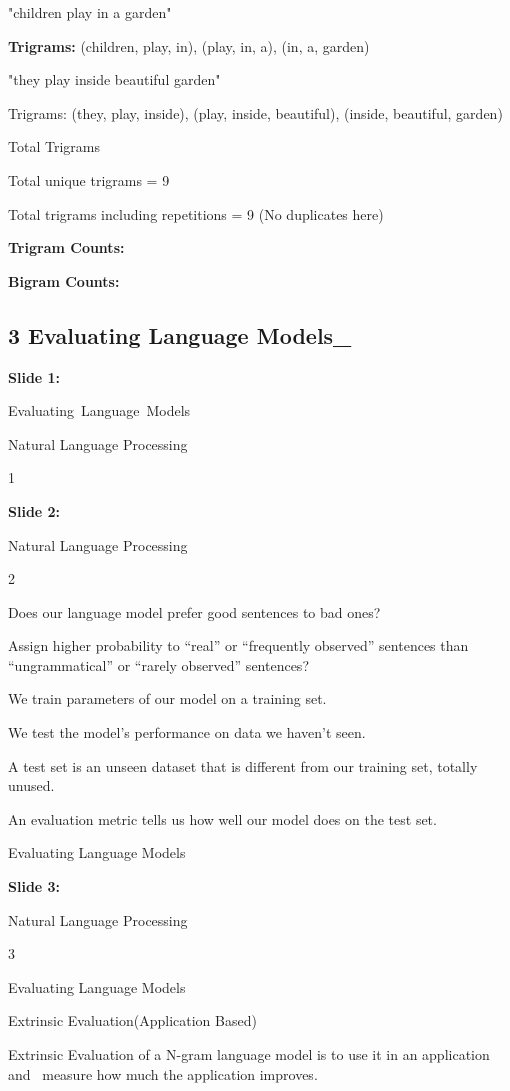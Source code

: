 \documentclass[11pt,a4paper]{article}
\begin{document}
"children play in a garden"

\textbf{Trigrams:}  (children, play, in), (play, in, a), (in, a, garden)

"they play inside beautiful garden"

Trigrams: (they, play, inside), (play, inside, beautiful), (inside, beautiful, garden)

Total Trigrams

Total unique trigrams = 9

Total trigrams including repetitions = 9 (No duplicates here)

\textbf{Trigram Counts:} 

\textbf{Bigram Counts:} 


\subsection{3 Evaluating Language Models_}

\textbf{Slide 1:}

Evaluating Language Models

Natural Language Processing

1

\textbf{Slide 2:}

Natural Language Processing

2

Does our language model prefer good sentences to bad ones?

Assign higher probability to “real” or “frequently observed” sentences than  “ungrammatical” or “rarely observed” sentences?

We train parameters of our model on a training set.

We test the model’s performance on data we haven’t seen.

A test set is an unseen dataset that is different from our training set, totally unused.

An evaluation metric tells us how well our model does on the test set.

Evaluating Language Models

\textbf{Slide 3:}

Natural Language Processing

3

Evaluating Language Models

Extrinsic Evaluation(Application Based)

Extrinsic Evaluation of a N-gram language model is to use it in an application and  measure how much the application improves.
\end{document}

